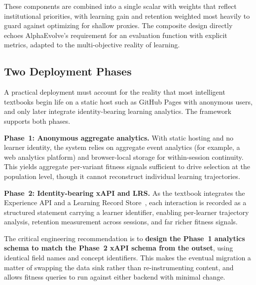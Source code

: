 These components are combined into a single scalar with weights that reflect
institutional priorities, with learning gain and retention weighted most
heavily to guard against optimizing for shallow proxies. The composite design
directly echoes AlphaEvolve's requirement for an evaluation function with
explicit metrics, adapted to the multi-objective reality of learning.

\subsection{Two Deployment Phases}

A practical deployment must account for the reality that most intelligent
textbooks begin life on a static host such as GitHub Pages with anonymous
users, and only later integrate identity-bearing learning analytics. The
framework supports both phases.

\textbf{Phase~1: Anonymous aggregate analytics.} With static hosting and no
learner identity, the system relies on aggregate event analytics (for example,
a web analytics platform) and browser-local storage for within-session
continuity. This yields aggregate per-variant fitness signals sufficient to
drive selection at the population level, though it cannot reconstruct
individual learning trajectories.

\textbf{Phase~2: Identity-bearing xAPI and LRS.} As the textbook integrates
the Experience API and a Learning Record Store~\cite{adl2013xapi}, each
interaction is recorded as a structured statement carrying a learner
identifier, enabling per-learner trajectory analysis, retention measurement
across sessions, and far richer fitness signals.

The critical engineering recommendation is to \textbf{design the Phase~1
analytics schema to match the Phase~2 xAPI schema from the outset}, using
identical field names and concept identifiers. This makes the eventual
migration a matter of swapping the data sink rather than re-instrumenting
content, and allows fitness queries to run against either backend with minimal
change.
